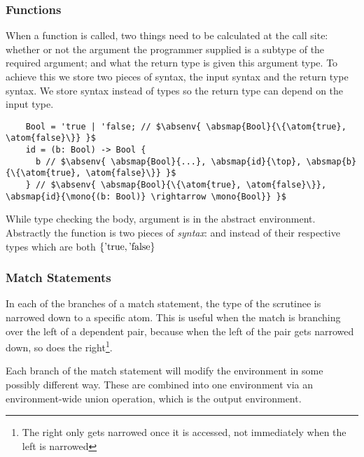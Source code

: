 \documentclass[12pt,twoside]{report}
\begin{document}
\subsubsection{Functions}
When a function is called, two things need to be calculated at the call site: whether or not the argument the programmer supplied is a subtype of the required argument; and what the return type is given this argument type. To achieve this we store two pieces of syntax, the input syntax and the return type syntax. We store syntax instead of types so the return type can depend on the input type.

\begin{listing}[H]
  \begin{verbatim}
    Bool = 'true | 'false; // $\absenv{ \absmap{Bool}{\{\atom{true}, \atom{false}\}} }$
    id = (b: Bool) -> Bool {
      b // $\absenv{ \absmap{Bool}{...}, \absmap{id}{\top}, \absmap{b}{\{\atom{true}, \atom{false}\}} }$
    } // $\absenv{ \absmap{Bool}{\{\atom{true}, \atom{false}\}}, \absmap{id}{\mono{(b: Bool)} \rightarrow \mono{Bool}} }$
  \end{verbatim}
  \caption{While type checking the body, argument  is in the abstract environment. Abstractly the function is two pieces of \textit{syntax}:  and  instead of their respective types which are both $\{\atom{true}, \atom{false}\}$}
\end{listing}



\subsubsection{Match Statements}
In each of the branches of a match statement, the type of the scrutinee is narrowed down to a specific atom. This is useful when the match is branching over the left of a dependent pair, because when the left of the pair gets narrowed down, so does the right\footnote{The right only gets narrowed once it is accessed, not immediately when the left is narrowed}.

Each branch of the match statement will modify the environment in some possibly different way. These are combined into one environment via an environment-wide union operation, which is the output environment.
\end{document}
